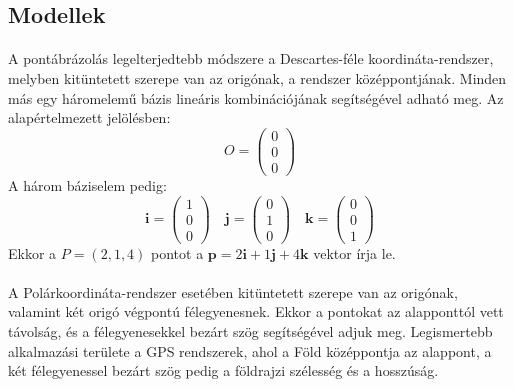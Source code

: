 \documentclass[12pt]{report}
\begin{document}
\subsection{Modellek}
\paragraph{}
A pontábrázolás legelterjedtebb módszere a Descartes-féle koordináta-rendszer, melyben kitüntetett szerepe van az origónak, a rendszer középpontjának. Minden más egy háromelemű bázis lineáris kombinációjának segítségével adható meg. Az alapértelmezett jelölésben:
$$
O = \left( \begin{array}{c} 0\\ 0\\ 0 \end{array} \right)
$$
A három báziselem pedig:
$$
\mathbf{i} = \left( \begin{array}{c} 1\\ 0\\ 0 \end{array} \right) \quad \mathbf{j} = \left( \begin{array}{c} 0\\ 1\\ 0 \end{array} \right) \quad \mathbf{k} = \left( \begin{array}{c} 0\\ 0\\ 1 \end{array} \right)
$$
Ekkor a $P = (2, 1, 4)$ pontot a $\mathbf{p} = 2 \mathbf{i} + 1 \mathbf{j} + 4 \mathbf{k}$ vektor írja le.
\paragraph{}
A Polárkoordináta-rendszer esetében kitüntetett szerepe van az origónak, valamint két origó végpontú félegyenesnek. Ekkor a pontokat az alapponttól vett távolság, és a félegyenesekkel bezárt szög segítségével adjuk meg. Legismertebb alkalmazási területe a GPS rendszerek, ahol a Föld középpontja az alappont, a két félegyenessel bezárt szög pedig a földrajzi szélesség és a hosszúság.
\end{document}
